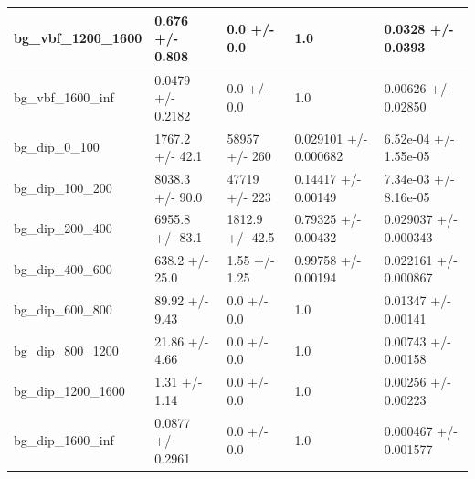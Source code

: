 \documentclass[a4paper, 10pt]{article}
\begin{document}
\begin{table}[H]
\begin{center}
\begin{tabular}{|m{20.0mm}|m{27.0mm}|m{27.0mm}|m{33.0mm}|m{32.0mm}|}
      \hline
      {\cellcolor{white}         bg\_vbf\_1200\_1600}& {\cellcolor{white}         0.676 +/\-- 0.808}& {\cellcolor{white}         0.0 +/\-- 0.0}& {\cellcolor{white}         1.0}& {\cellcolor{white}         0.0328 +/\-- 0.0393}\\
      \hline
      {\cellcolor{white}         bg\_vbf\_1600\_inf}& {\cellcolor{white}         0.0479 +/\-- 0.2182}& {\cellcolor{white}         0.0 +/\-- 0.0}& {\cellcolor{white}         1.0}& {\cellcolor{white}         0.00626 +/\-- 0.02850}\\
      \hline
      {\cellcolor{white}         bg\_dip\_0\_100}& {\cellcolor{white}         1767.2 +/\-- 42.1}& {\cellcolor{white}         58957 +/\-- 260}& {\cellcolor{white}         0.029101 +/\-- 0.000682}& {\cellcolor{white}         6.52e-04 +/\-- 1.55e-05}\\
      \hline
      {\cellcolor{white}         bg\_dip\_100\_200}& {\cellcolor{white}         8038.3 +/\-- 90.0}& {\cellcolor{white}         47719 +/\-- 223}& {\cellcolor{white}         0.14417 +/\-- 0.00149}& {\cellcolor{white}         7.34e-03 +/\-- 8.16e-05}\\
      \hline
      {\cellcolor{white}         bg\_dip\_200\_400}& {\cellcolor{white}         6955.8 +/\-- 83.1}& {\cellcolor{white}         1812.9 +/\-- 42.5}& {\cellcolor{white}         0.79325 +/\-- 0.00432}& {\cellcolor{white}         0.029037 +/\-- 0.000343}\\
      \hline
      {\cellcolor{white}         bg\_dip\_400\_600}& {\cellcolor{white}         638.2 +/\-- 25.0}& {\cellcolor{white}         1.55 +/\-- 1.25}& {\cellcolor{white}         0.99758 +/\-- 0.00194}& {\cellcolor{white}         0.022161 +/\-- 0.000867}\\
      \hline
      {\cellcolor{white}         bg\_dip\_600\_800}& {\cellcolor{white}         89.92 +/\-- 9.43}& {\cellcolor{white}         0.0 +/\-- 0.0}& {\cellcolor{white}         1.0}& {\cellcolor{white}         0.01347 +/\-- 0.00141}\\
      \hline
      {\cellcolor{white}         bg\_dip\_800\_1200}& {\cellcolor{white}         21.86 +/\-- 4.66}& {\cellcolor{white}         0.0 +/\-- 0.0}& {\cellcolor{white}         1.0}& {\cellcolor{white}         0.00743 +/\-- 0.00158}\\
      \hline
      {\cellcolor{white}         bg\_dip\_1200\_1600}& {\cellcolor{white}         1.31 +/\-- 1.14}& {\cellcolor{white}         0.0 +/\-- 0.0}& {\cellcolor{white}         1.0}& {\cellcolor{white}         0.00256 +/\-- 0.00223}\\
      \hline
      {\cellcolor{white}         bg\_dip\_1600\_inf}& {\cellcolor{white}         0.0877 +/\-- 0.2961}& {\cellcolor{white}         0.0 +/\-- 0.0}& {\cellcolor{white}         1.0}& {\cellcolor{white}         0.000467 +/\-- 0.001577}\\
\hline
    \end{tabular}
  \end{center}
\end{table}
\end{document}

